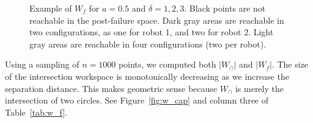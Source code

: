 \documentclass[12pt]{report}
\begin{document}
\begin{figure}
\begin{center}
	\caption{ 
	 Example of $W_f$ for $a=0.5$ and $\delta=1,2,3$. Black points are not reachable in the post-failure space.  Dark gray areas are reachable in two configurations, as one for robot 1, and two for robot 2.  Light gray areas are reachable in four configurations (two per robot).
	}
	\label{fig:spaceshape}
\end{center}
\end{figure}


Using a sampling of $n = 1000$ points, we computed both $|W_\cap|$ and $|W_f|$. The size of the intersection workspace is  monotonically decreasing as we increase the separation distance. This makes geometric sense because $W_\cap$ is merely the intersection of two circles.  See Figure~\ref{fig:w_cap} and column three of Table~\ref{tab:w_f}.
\end{document}
